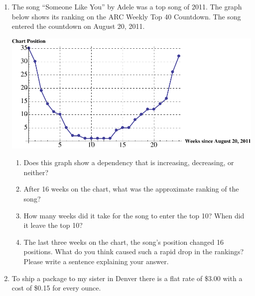 \documentclass[12pt]{article}
\begin{document}
\hrulefill


\newpage

\begin{enumerate}

\item The song ``Someone Like You'' by Adele was a top song of 2011.  The graph below shows its ranking on the ARC Weekly Top 40 Countdown.  The song entered the countdown on August 20, 2011.


\includegraphics [width = 6in] {adele}

\begin{enumerate}
\item Does this graph show a dependency that is increasing, decreasing, or neither?
\vfill
\item After 16 weeks on the chart, what was the approximate ranking of the song?
\vfill
\item How many weeks did it take for the song to enter the top 10?  When did it leave the top 10?
\vfill
\item The last three weeks on the chart, the song's position changed 16 positions.  What do you think caused such a rapid drop in the rankings?  Please write a sentence explaining your answer.
\vfill
\end{enumerate}




\newpage
\item  To ship a package to my sister in Denver there is a flat rate of \$3.00 with a cost of \$0.15 for every ounce.  


\end{enumerate}
\end{document}
